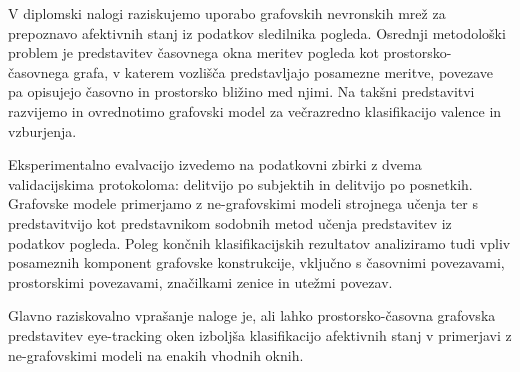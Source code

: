 V diplomski nalogi raziskujemo uporabo grafovskih nevronskih mrež za prepoznavo afektivnih stanj iz podatkov sledilnika pogleda.
Osrednji metodološki problem je predstavitev časovnega okna meritev pogleda kot prostorsko-časovnega grafa, v katerem vozlišča predstavljajo posamezne meritve, povezave pa opisujejo časovno in prostorsko bližino med njimi.
Na takšni predstavitvi razvijemo in ovrednotimo grafovski model za večrazredno klasifikacijo valence in vzburjenja.

Eksperimentalno evalvacijo izvedemo na podatkovni zbirki \MAHNOB{} z dvema validacijskima protokoloma: delitvijo po subjektih in delitvijo po posnetkih.
Grafovske modele primerjamo z ne-grafovskimi modeli strojnega učenja ter s predstavitvijo \GazeMAE{} kot predstavnikom sodobnih metod učenja predstavitev iz podatkov pogleda.
Poleg končnih klasifikacijskih rezultatov analiziramo tudi vpliv posameznih komponent grafovske konstrukcije, vključno s časovnimi povezavami, prostorskimi povezavami, značilkami zenice in utežmi povezav.

Glavno raziskovalno vprašanje naloge je, ali lahko prostorsko-časovna grafovska predstavitev eye-tracking oken izboljša klasifikacijo afektivnih stanj v primerjavi z ne-grafovskimi modeli na enakih vhodnih oknih.
